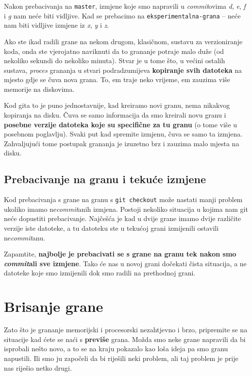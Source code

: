 Nakon prebacivanja na \verb+master+, izmjene koje smo napravili u \emph{commit}ovima \emph d, \emph e, \emph f i \emph g nam neće biti vidljive.
Kad se prebacimo na \verb+eksperimentalna-grana+ -- neće nam biti vidljive izmjene iz \emph x, \emph y i \emph z.

Ako ste ikad radili grane na nekom drugom, klasičnom, sustavu za verzioniranje koda, onda ste vjerojatno naviknuti da to grananje potraje malo duže (od nekoliko sekundi do nekoliko minuta).
Stvar je u tome što, u većini ostalih sustava, \emph{proces} grananja u stvari podradzumijeva \textbf{kopiranje svih datoteka} na mjesto gdje se čuva nova grana.
To, em traje neko vrijeme, em zauzima više memorije na diskovima.

Kod gita to je puno jednostavnije, kad kreiramo novi granu, nema nikakvog kopiranja na disku. 
Čuva se samo informacija da smo kreirali novu granu i \textbf{posebne verzije datoteka koje su specifične za tu granu} (o tome više u posebnom poglavlju).
Svaki put kad spremite izmjenu, čuva se samo ta izmjena.
Zahvaljujući tome postupak grananja je izuzetno brz i zauzima malo mjesta na disku.

\subsection*{Prebacivanje na granu i tekuće izmjene}

Kod prebacivanja s grane na granu s \verb+git checkout+ može nastati manji problem ukoliko imamo ne\emph{commit}anih izmjena.
Postoji nekoliko situacija u kojima nam git neće dopustiti prebacivanje.
Najčešća je kad u dvije grane imamo dvije različite verzije iste datoteke, a tu datoteku ste u tekućoj grani izmijenili ostavili ne\emph{commit}anu.

Zapamtite, \textbf{najbolje je prebacivati se s grane na granu tek nakon smo \emph{commit}ali sve izmjene}. Tako će nas u novoj grani dočekati čista situacija, a ne datoteke koje smo izmijenili dok smo radili na prethodnoj grani. 

\section*{Brisanje grane}

Zato što je grananje memorijski i procesorski nezahtjevno i brzo, pripremite se na situacije kad ćete se naći s \textbf{previše} grana.
Možda smo neke grane napravili da bi isprobali nešto novo, a to se na kraju pokazalo kao loša ideja pa smo granu napustili.
Ili smo ju započeli da bi riješili neki problem, ali taj problem je prije nas riješio netko drugi.

